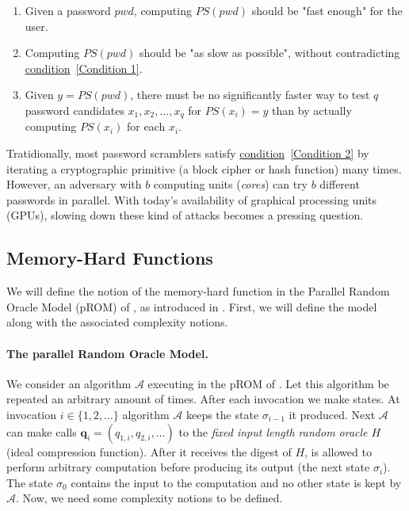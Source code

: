 \begin{enumerate}
  \item \label{Condition 1} Given a password $pwd$, computing $PS(pwd)$ should be "fast enough" for the user.
  \item \label{Condition 2} Computing $PS(pwd)$ should be "as slow as possible", without contradicting \hyperref[Condition 1]{condition}~\ref{Condition 1}.
  \item Given $y=PS(pwd)$, there must be no significantly faster way to test $q$ password candidates $x_1, x_2, \dots, x_q$ for $PS(x_i)=y$ than by actually computing $PS(x_i)$ for each $x_i$.
\end{enumerate}

Tratidionally, most password scramblers satisfy \hyperref[Condition 2]{condition}~\ref{Condition 2} by iterating a cryptographic primitive (a block cipher or hash function) many times. However, an adversary with $b$ computing units (\emph{cores}) can try $b$ different passwords in parallel. With today's availability of graphical processing units (GPUs), slowing down these kind of attacks becomes a pressing question.

\subsection{Memory-Hard Functions} \label{sec:memory-hard}
We will define the notion of the memory-hard function in the Parallel Random Oracle Model (pROM) of \cite{Alwen:2015:HPC:2746539.2746622}, as introduced in \cite{cryptoeprint:2016:875}. First, we will define the model along with the associated complexity notions.

\paragraph{The parallel Random Oracle Model.} We consider an algorithm $\mathcal{A}$ executing in the pROM of \cite{Alwen:2015:HPC:2746539.2746622}. Let this algorithm be repeated an arbitrary amount of times. After each invocation we make states. At invocation $i \in \{ 1,2, \dots \}$ algorithm $\mathcal{A}$ keeps the state $\sigma_{i-1}$ it produced. Next $\mathcal{A}$ can make calls $\textbf{q}_i = (q_{1,i}, q_{2,i}, \dots)$
to the \emph{fixed input length random oracle $H$} (ideal compression function). After it receives the digest of $H$, is allowed to perform arbitrary computation before producing its output (the next state $\sigma_i$). The state $\sigma_0$ contains the input to the computation and no other state is kept by $\mathcal{A}$. Now, we need some complexity notions to be defined.

